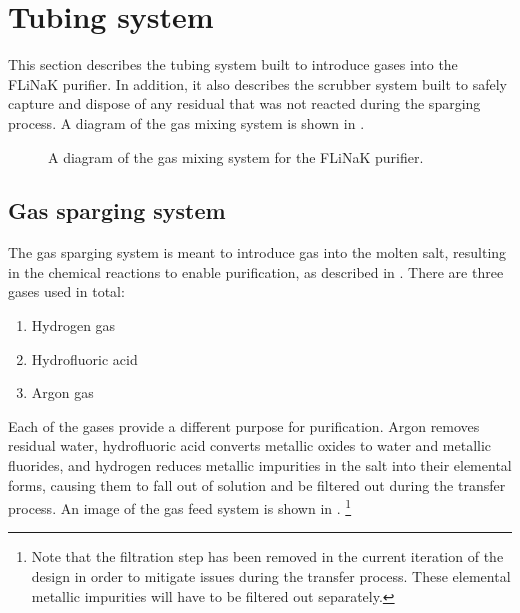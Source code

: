 %
%

\section{Tubing system}

This section describes the tubing system built to introduce gases into the
FLiNaK purifier. In addition, it also describes the scrubber system built to
safely capture and dispose of any residual  that was not
reacted during the sparging process.
A diagram of the gas mixing system is shown in . \par

\begin{figure}
  \centering
  \caption{A diagram of the gas mixing system for the FLiNaK purifier.}
  \label{fig: gas mixing diagram}
\end{figure}

\subsection{Gas sparging system}

The gas sparging system is meant to introduce gas into the
molten salt, resulting in the chemical reactions to enable
purification, as described in .
There are three gases used in total:

\begin{enumerate}
  \item Hydrogen gas
  \item Hydrofluoric acid
  \item Argon gas
\end{enumerate}

Each of the gases provide a different purpose for purification.
Argon removes residual water, hydrofluoric acid converts metallic
oxides to water and metallic fluorides, and  hydrogen reduces
metallic impurities in the salt into their elemental forms, causing
them to fall out of solution and be filtered out during the transfer
process. An image of the gas feed system is shown in
.
\footnote{Note that the filtration step has been removed in
  the current iteration of the design in order to mitigate issues
  during the transfer process. These elemental metallic impurities
will have to be filtered out separately.} \par

